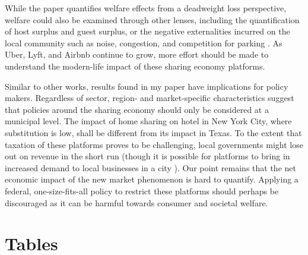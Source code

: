 \documentclass[12pt]{article}
\begin{document}
		\par
		While the paper quantifies welfare effects from a deadweight loss perspective, welfare could also be examined through other lenses, including the quantification of host surplus and guest surplus, or the negative externalities incurred on the local community such as noise, congestion, and competition for parking \citep{farronato2018welfare, gurran2017tourists}. As Uber, Lyft, and Airbnb continue to grow, more effort should be made to understand the modern-life impact of these sharing economy platforms.
		
		\par
		Similar to other works, results found in my paper have implications for policy makers. Regardless of sector, region- and market-specific characteristics suggest that policies around the sharing economy should only be considered at a municipal level. The impact of home sharing on hotel in New York City, where substitution is low, shall be different from its impact in Texas. To the extent that taxation of these platforms proves to be challenging, local governments might lose out on revenue in the short run (though it is possible for platforms to bring in increased demand to local businesses in a city \citep{zervas2017rise}). Our point remains that the net economic impact of the new market phenomenon is hard to quantify. Applying a federal, one-size-fits-all policy to restrict these platforms should perhaps be discouraged as it can be harmful towards consumer and societal welfare.
		

	\clearpage %
	
	\linespread{1} %
	
	\section*{Tables} %
\end{document}
